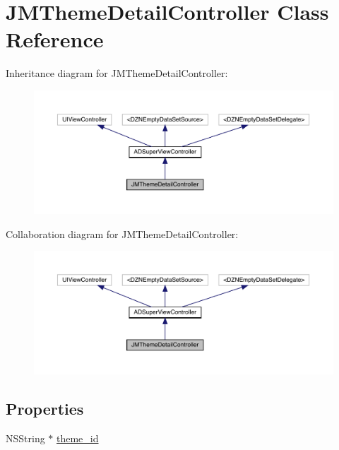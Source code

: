 \hypertarget{interface_j_m_theme_detail_controller}{}\section{J\+M\+Theme\+Detail\+Controller Class Reference}
\label{interface_j_m_theme_detail_controller}


Inheritance diagram for J\+M\+Theme\+Detail\+Controller\+:\nopagebreak
\begin{figure}[H]
\begin{center}
\leavevmode
\includegraphics[width=350pt]{interface_j_m_theme_detail_controller__inherit__graph}
\end{center}
\end{figure}


Collaboration diagram for J\+M\+Theme\+Detail\+Controller\+:\nopagebreak
\begin{figure}[H]
\begin{center}
\leavevmode
\includegraphics[width=350pt]{interface_j_m_theme_detail_controller__coll__graph}
\end{center}
\end{figure}
\subsection*{Properties}
\begin{DoxyCompactItemize}
\item 
N\+S\+String $\ast$ \mbox{\hyperlink{interface_j_m_theme_detail_controller_a9fe2dcc978fd7fe925c6a9b688ed8835}{theme\+\_\+id}}
\end{DoxyCompactItemize}
